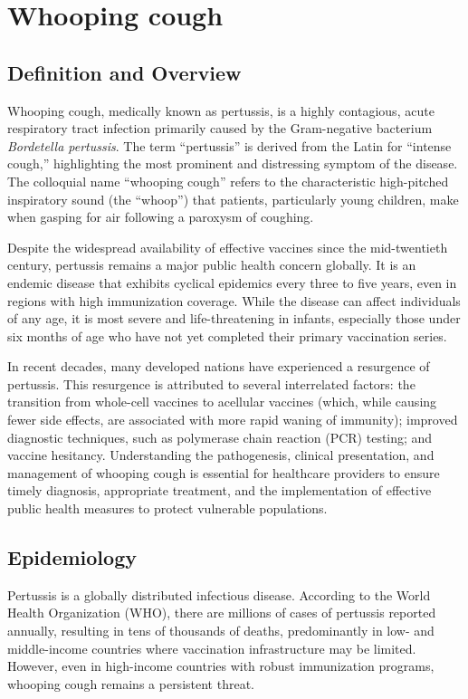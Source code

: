 \chapter{Whooping cough}

\section*{Definition and Overview}
Whooping cough, medically known as pertussis, is a highly contagious, acute respiratory tract infection primarily caused by the Gram-negative bacterium \textit{Bordetella pertussis}. The term ``pertussis'' is derived from the Latin for ``intense cough,'' highlighting the most prominent and distressing symptom of the disease. The colloquial name ``whooping cough'' refers to the characteristic high-pitched inspiratory sound (the ``whoop'') that patients, particularly young children, make when gasping for air following a paroxysm of coughing.

Despite the widespread availability of effective vaccines since the mid-twentieth century, pertussis remains a major public health concern globally. It is an endemic disease that exhibits cyclical epidemics every three to five years, even in regions with high immunization coverage. While the disease can affect individuals of any age, it is most severe and life-threatening in infants, especially those under six months of age who have not yet completed their primary vaccination series.

In recent decades, many developed nations have experienced a resurgence of pertussis. This resurgence is attributed to several interrelated factors: the transition from whole-cell vaccines to acellular vaccines (which, while causing fewer side effects, are associated with more rapid waning of immunity); improved diagnostic techniques, such as polymerase chain reaction (PCR) testing; and vaccine hesitancy. Understanding the pathogenesis, clinical presentation, and management of whooping cough is essential for healthcare providers to ensure timely diagnosis, appropriate treatment, and the implementation of effective public health measures to protect vulnerable populations.

\section*{Epidemiology}
Pertussis is a globally distributed infectious disease. According to the World Health Organization (WHO), there are millions of cases of pertussis reported annually, resulting in tens of thousands of deaths, predominantly in low- and middle-income countries where vaccination infrastructure may be limited. However, even in high-income countries with robust immunization programs, whooping cough remains a persistent threat.

